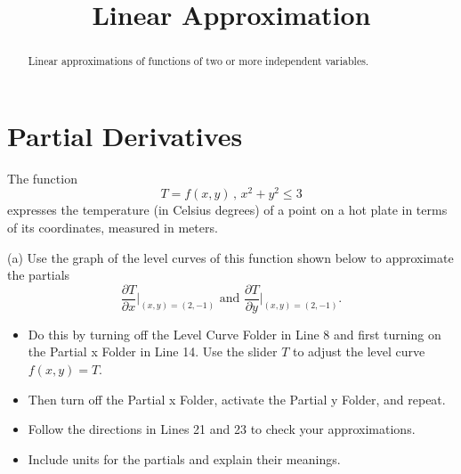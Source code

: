 \documentclass{ximera}
\title{Linear Approximation}
\begin{document}
\begin{abstract}
Linear approximations of functions of two or more independent variables.
\end{abstract}
\maketitle


\section{Partial Derivatives}

\begin{example}  \label{Edgtr543}

The function
\[
    T = f(x,y) \, , \, x^2 + y^2 \leq 3
\]
expresses the temperature (in Celsius degrees) of a point on a hot plate in terms of its coordinates, measured in meters. 

(a) Use the graph of the level curves of this function shown below to approximate the partials 
\[
    \frac{\partial T}{\partial x}\Big|_{(x,y)=(2,-1)} \text{ and } \frac{\partial T}{\partial y}\Big|_{(x,y)=(2,-1)} .
\]

\begin{itemize}
\item{Do this by turning off the Level Curve Folder in Line 8 and first turning on the Partial x Folder in Line 14. Use the slider $T$ to adjust the level curve $f(x,y)=T$.} 

\item{Then turn off the Partial x Folder, activate the Partial y Folder, and repeat.}

\item{Follow the directions in Lines 21 and 23 to check your approximations.}

\item{Include units for the partials and explain their meanings.}

\end{itemize}

 
\begin{onlineOnly}
    \begin{center}
\end{center}
\end{onlineOnly}


\end{example}
\end{document}
